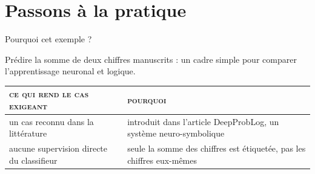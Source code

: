 \documentclass[aspectratio=169,10pt]{beamer}
\begin{document}
\section{Passons à la pratique}

\begin{frame}{Pourquoi cet exemple ?}
  \begin{center}
    \small Prédire la somme de deux chiffres manuscrits : un cadre
    simple pour comparer l'apprentissage neuronal et logique.
  \end{center}

  \vspace{0.6em}
  \begin{center}
  \footnotesize
  \renewcommand{\arraystretch}{1.8}
  \begin{tabular}{@{} l >{\raggedright\arraybackslash}m{5.6cm} @{}}
    \toprule
    {\color{ash}\scshape\footnotesize ce qui rend le cas exigeant} &
    {\color{ash}\scshape\footnotesize pourquoi} \\
    \midrule
    un cas reconnu dans la littérature & introduit dans l'article
      DeepProbLog, un système neuro-symbolique \\
    aucune supervision directe du classifieur & seule la somme des
      chiffres est étiquetée, pas les chiffres eux-mêmes \\
    \bottomrule
  \end{tabular}
  \end{center}
\end{frame}
\end{document}
